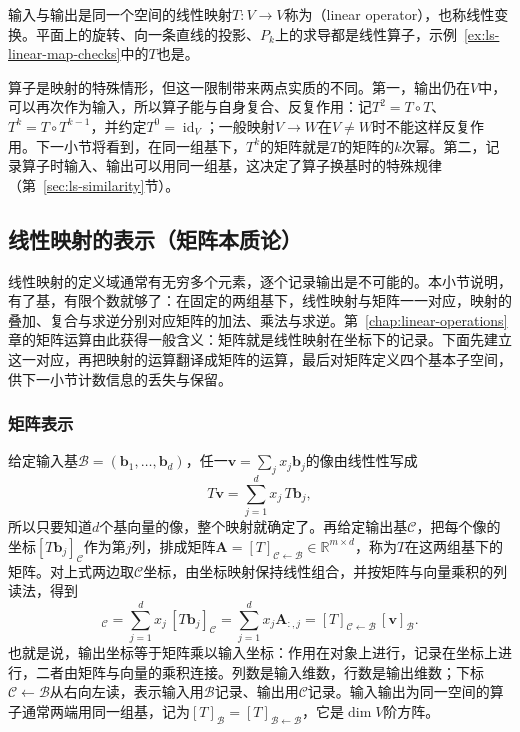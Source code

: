 \label{sec:ls-operator-powers}
输入与输出是同一个空间的线性映射$T:V\to V$称为（linear operator），也称线性变换。平面上的旋转、向一条直线的投影、$P_k$上的求导都是线性算子，示例~\ref{ex:ls-linear-map-checks}中的$T$也是。

算子是映射的特殊情形，但这一限制带来两点实质的不同。第一，输出仍在$V$中，可以再次作为输入，所以算子能与自身复合、反复作用：记$T^2=T\circ T$、$T^k=T\circ T^{k-1}$，并约定$T^0=\operatorname{id}_V$；一般映射$V\to W$在$V\neq W$时不能这样反复作用。下一小节将看到，在同一组基下，$T^k$的矩阵就是$T$的矩阵的$k$次幂。第二，记录算子时输入、输出可以用同一组基，这决定了算子换基时的特殊规律（第~\ref{sec:ls-similarity}节）。

\subsection{线性映射的表示（矩阵本质论）}
\label{sec:ls-map-representation}

线性映射的定义域通常有无穷多个元素，逐个记录输出是不可能的。本小节说明，有了基，有限个数就够了：在固定的两组基下，线性映射与矩阵一一对应，映射的叠加、复合与求逆分别对应矩阵的加法、乘法与求逆。第~\ref{chap:linear-operations}章的矩阵运算由此获得一般含义：矩阵就是线性映射在坐标下的记录。下面先建立这一对应，再把映射的运算翻译成矩阵的运算，最后对矩阵定义四个基本子空间，供下一小节计数信息的丢失与保留。

\subsubsection{矩阵表示}

给定输入基$\mathcal B=(\bm b_1,\ldots,\bm b_d)$，任一$\bm v=\sum_jx_j\bm b_j$的像由线性性写成
\[
 T\bm v=\sum_{j=1}^d x_j\,T\bm b_j,
\]
所以只要知道$d$个基向量的像，整个映射就确定了。再给定输出基$\mathcal C$，把每个像的坐标$[T\bm b_j]_{\mathcal C}$作为第$j$列，排成矩阵$\bm A=[T]_{\mathcal C\leftarrow\mathcal B}\in\mathbb R^{m\times d}$，称为$T$在这两组基下的矩阵。对上式两边取$\mathcal C$坐标，由坐标映射保持线性组合，并按矩阵与向量乘积的列读法，得到
\begin{equation}
 [T\bm v]_{\mathcal C}
 =\sum_{j=1}^d x_j\,[T\bm b_j]_{\mathcal C}
 =\sum_{j=1}^d x_j\bm A_{:,j}
 =[T]_{\mathcal C\leftarrow\mathcal B}\,[\bm v]_{\mathcal B}.
 \label{eq:linear-algebra-map-matrix-representation}
\end{equation}
也就是说，输出坐标等于矩阵乘以输入坐标：作用在对象上进行，记录在坐标上进行，二者由矩阵与向量的乘积连接。列数是输入维数，行数是输出维数；下标$\mathcal C\leftarrow\mathcal B$从右向左读，表示输入用$\mathcal B$记录、输出用$\mathcal C$记录。输入输出为同一空间的算子通常两端用同一组基，记为$[T]_{\mathcal B}=[T]_{\mathcal B\leftarrow\mathcal B}$，它是$\dim V$阶方阵。


